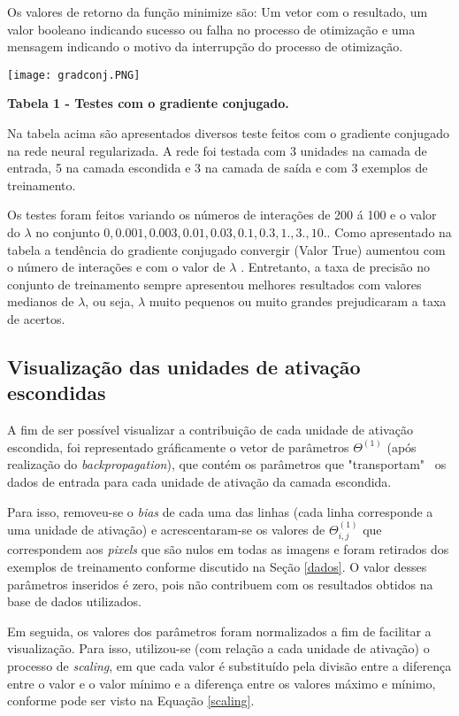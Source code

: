 \documentclass[12pt]{article}
\begin{document}
Os valores de retorno da função minimize são: Um vetor com o resultado, um valor booleano indicando sucesso ou falha no processo de otimização e uma mensagem indicando o motivo da interrupção do processo de otimização. 

\begin{center}
\texttt{[image: gradconj.PNG]}

\textbf{Tabela 1 - Testes com o gradiente conjugado.}
\end{center}

Na tabela acima são apresentados diversos teste feitos com o gradiente conjugado na rede neural regularizada. A rede foi testada com 3 unidades na camada de entrada, 5 na camada escondida e 3 na camada de  saída e com 3 exemplos de treinamento.

Os testes foram feitos variando os números de interações de 200 á 100 e o valor do $\lambda$ no conjunto ${0, 0.001, 0.003, 0.01, 0.03, 0.1, 0.3, 1., 3., 10.}$. Como apresentado na tabela a tendência do gradiente conjugado convergir (Valor True) aumentou com o número de interações e com o valor de $\lambda$ . Entretanto, a taxa de precisão no conjunto de treinamento sempre apresentou melhores resultados com valores medianos de $\lambda$, ou seja, $\lambda$ muito pequenos ou muito grandes prejudicaram a taxa de acertos. 


\subsection{Visualização das unidades de ativação escondidas}
A fim de ser possível visualizar a contribuição de cada unidade de ativação escondida, foi representado gráficamente o vetor de parâmetros $\Theta^{(1)}$ (após realização do \textit{backpropagation}), que contém os parâmetros que "transportam" \ os dados de entrada para cada unidade de ativação da camada escondida.

Para isso, removeu-se o \textit{bias} de cada uma das linhas (cada linha corresponde a uma unidade de ativação) e acrescentaram-se os valores de $\Theta^{(1)}_{i,j}$ que correspondem aos \textit{pixels} que são nulos em todas as imagens e foram retirados dos exemplos de treinamento conforme discutido na Seção \ref{dados}. O valor desses parâmetros inseridos é zero, pois não contribuem com os resultados obtidos na base de dados utilizados.

Em seguida, os valores dos parâmetros foram normalizados a fim de facilitar a visualização. Para isso, utilizou-se (com relação a cada unidade de ativação) o processo de \textit{scaling}, em que cada valor é substituído pela divisão entre a diferença entre o valor e o valor mínimo e a diferença entre os valores máximo e mínimo, conforme pode ser visto na Equação \ref{scaling}.
\end{document}
